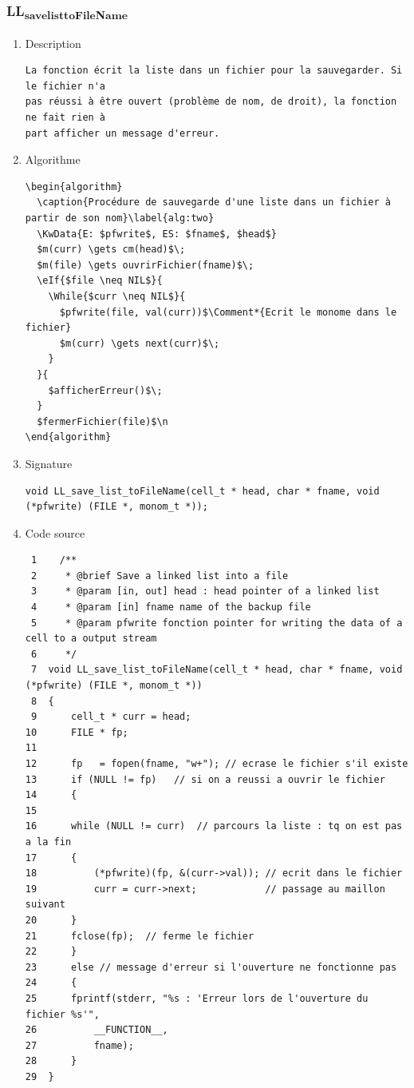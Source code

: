 \documentclass[11pt]{article}
\begin{document}
\subsubsection{LL\textsubscript{save}\textsubscript{list}\textsubscript{toFileName}}
\label{sec:org42539df}
\begin{enumerate}
\item Description
\label{sec:orga0a024a}

\begin{verbatim}
La fonction écrit la liste dans un fichier pour la sauvegarder. Si le fichier n'a
pas réussi à être ouvert (problème de nom, de droit), la fonction ne fait rien à
part afficher un message d'erreur.
\end{verbatim}

\item Algorithme
\label{sec:org5079cb2}

\begin{verbatim}
\begin{algorithm}
  \caption{Procédure de sauvegarde d'une liste dans un fichier à partir de son nom}\label{alg:two}
  \KwData{E: $pfwrite$, ES: $fname$, $head$}
  $m(curr) \gets cm(head)$\;
  $m(file) \gets ouvrirFichier(fname)$\;
  \eIf{$file \neq NIL$}{
    \While{$curr \neq NIL$}{
      $pfwrite(file, val(curr))$\Comment*{Ecrit le monome dans le fichier}
      $m(curr) \gets next(curr)$\;
    }
  }{
    $afficherErreur()$\;
  }
  $fermerFichier(file)$\n
\end{algorithm}
\end{verbatim}

\item Signature
\label{sec:org052b382}

\begin{verbatim}
void LL_save_list_toFileName(cell_t * head, char * fname, void (*pfwrite) (FILE *, monom_t *));
\end{verbatim}

\item Code source
\label{sec:org695c654}

\begin{verbatim}
 1    /**
 2     * @brief Save a linked list into a file
 3     * @param [in, out] head : head pointer of a linked list
 4     * @param [in] fname name of the backup file
 5     * @param pfwrite fonction pointer for writing the data of a cell to a output stream
 6     */
 7  void LL_save_list_toFileName(cell_t * head, char * fname, void (*pfwrite) (FILE *, monom_t *))
 8  {
 9      cell_t * curr = head;
10      FILE * fp;
11  
12      fp   = fopen(fname, "w+"); // ecrase le fichier s'il existe
13      if (NULL != fp)   // si on a reussi a ouvrir le fichier
14      {
15  
16  	while (NULL != curr)  // parcours la liste : tq on est pas a la fin
17  	{
18  	    (*pfwrite)(fp, &(curr->val)); // ecrit dans le fichier
19  	    curr = curr->next;            // passage au maillon suivant
20  	}
21  	fclose(fp);  // ferme le fichier
22      }
23      else // message d'erreur si l'ouverture ne fonctionne pas
24      {
25  	fprintf(stderr, "%s : 'Erreur lors de l'ouverture du fichier %s'",
26  		__FUNCTION__,
27  		fname);
28      }
29  }
\end{verbatim}


\end{enumerate}
\end{document}
